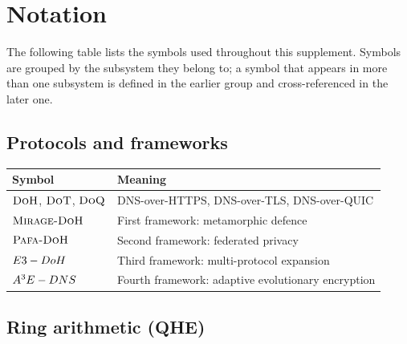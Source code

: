 %

\section*{Notation}

The following table lists the symbols used throughout this supplement.
Symbols are grouped by the subsystem they belong to; a symbol that
appears in more than one subsystem is defined in the earlier group and
cross-referenced in the later one.

\subsection*{Protocols and frameworks}

\begin{center}
\begin{tabular}{ll}
\toprule
Symbol & Meaning \\
\midrule
$\textsc{DoH}$, $\textsc{DoT}$, $\textsc{DoQ}$ & DNS-over-HTTPS, DNS-over-TLS, DNS-over-QUIC \\
$\textsc{Mirage-DoH}$              & First framework: metamorphic defence \\
$\textsc{Pafa-DoH}$                & Second framework: federated privacy \\
$E3-DoH$              & Third framework: multi-protocol expansion \\
$A\textsuperscript{3}E-DNS$             & Fourth framework: adaptive evolutionary encryption \\
\bottomrule
\end{tabular}
\end{center}

\subsection*{Ring arithmetic (QHE)}

